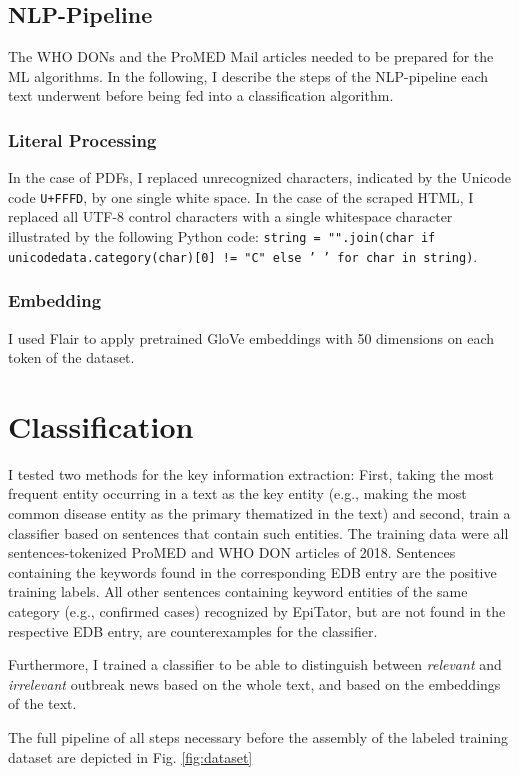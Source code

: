 \subsection{NLP-Pipeline}
  The WHO DONs and the ProMED Mail articles needed to be prepared for the ML algorithms.
  In the following, I describe the steps of the NLP-pipeline each text underwent before being fed into a classification algorithm.

\subsubsection{Literal Processing}
  In the case of PDFs, I replaced unrecognized characters, indicated by the Unicode code \texttt{U+FFFD}, by one single white space.
  In the case of the scraped HTML, I replaced all UTF-8 control characters with a single whitespace character illustrated by the following Python code: \texttt{string = "".join(char if unicodedata.category(char)[0] != "C" else ' ' for char in string)}.

\subsubsection{Embedding}
  I used Flair to apply pretrained GloVe embeddings with 50 dimensions on each token of the dataset.

\section{Classification}
  I tested two methods for the key information extraction: First, taking the most frequent entity occurring in a text as the key entity (e.g., making the most common disease entity as the primary thematized in the text) and second, train a classifier based on sentences that contain such entities.
  The training data were all sentences-tokenized ProMED and WHO DON articles of 2018.
  Sentences containing the keywords found in the corresponding EDB entry are the positive training labels.
  All other sentences containing keyword entities of the same category (e.g., confirmed cases) recognized by EpiTator, but are not found in the respective EDB entry, are counterexamples for the classifier.

  Furthermore, I trained a classifier to be able to distinguish between \textsl{relevant} and \textsl{irrelevant} outbreak news based on the whole text, and based on the embeddings of the text.

  The full pipeline of all steps necessary before the assembly of the labeled training dataset are depicted in Fig. \ref{fig:dataset}

